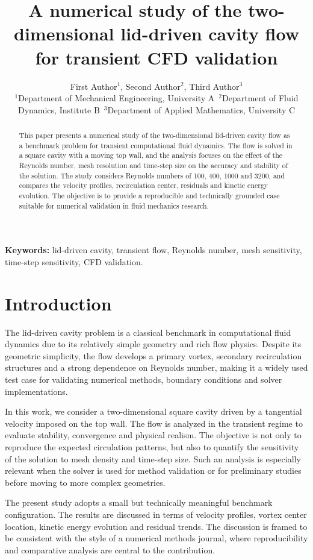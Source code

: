 \documentclass[10pt,twoside]{article}
\title{A numerical study of the two-dimensional lid-driven cavity flow for transient CFD validation}
\author{First Author$^{1}$, Second Author$^{2}$, Third Author$^{3}$\\
\small{$^{1}$Department of Mechanical Engineering, University A}\
\small{$^{2}$Department of Fluid Dynamics, Institute B}\
\small{$^{3}$Department of Applied Mathematics, University C}}
\date{}
\begin{document}
\maketitle

\begin{abstract}
This paper presents a numerical study of the two-dimensional lid-driven cavity flow as a benchmark problem for transient computational fluid dynamics. The flow is solved in a square cavity with a moving top wall, and the analysis focuses on the effect of the Reynolds number, mesh resolution and time-step size on the accuracy and stability of the solution. The study considers Reynolds numbers of 100, 400, 1000 and 3200, and compares the velocity profiles, recirculation center, residuals and kinetic energy evolution. The objective is to provide a reproducible and technically grounded case suitable for numerical validation in fluid mechanics research.
\end{abstract}

\begin{center}
\textbf{Keywords:} lid-driven cavity, transient flow, Reynolds number, mesh sensitivity, time-step sensitivity, CFD validation.
\end{center}

\section{Introduction}

The lid-driven cavity problem is a classical benchmark in computational fluid dynamics due to its relatively simple geometry and rich flow physics. Despite its geometric simplicity, the flow develops a primary vortex, secondary recirculation structures and a strong dependence on Reynolds number, making it a widely used test case for validating numerical methods, boundary conditions and solver implementations.

In this work, we consider a two-dimensional square cavity driven by a tangential velocity imposed on the top wall. The flow is analyzed in the transient regime to evaluate stability, convergence and physical realism. The objective is not only to reproduce the expected circulation patterns, but also to quantify the sensitivity of the solution to mesh density and time-step size. Such an analysis is especially relevant when the solver is used for method validation or for preliminary studies before moving to more complex geometries.

The present study adopts a small but technically meaningful benchmark configuration. The results are discussed in terms of velocity profiles, vortex center location, kinetic energy evolution and residual trends. The discussion is framed to be consistent with the style of a numerical methods journal, where reproducibility and comparative analysis are central to the contribution.
\end{document}
